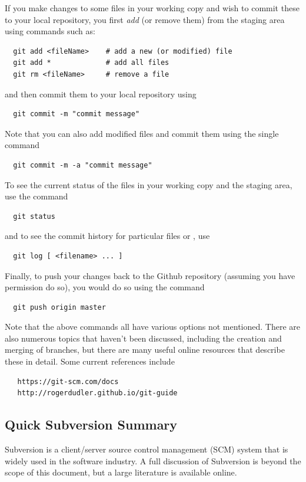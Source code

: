 If you make changes to some files in your working copy and wish to
commit these to your local repository, you first {\it add} (or remove
them) from the staging area using commands such as:
\begin{verbatim}
  git add <fileName>    # add a new (or modified) file
  git add *             # add all files
  git rm <fileName>     # remove a file
\end{verbatim}
and then commit them to your local repository using
\begin{verbatim}
  git commit -m "commit message"
\end{verbatim}
Note that you can also add modified files and commit them using the single
command
\begin{verbatim}
  git commit -m -a "commit message"
\end{verbatim}

To see the current status of the files in your working copy
and the staging area, use the command
\begin{verbatim}
  git status
\end{verbatim}
and to see the commit history for particular files or \directories{},
use 
\begin{verbatim}
  git log [ <filename> ... ]
\end{verbatim}

Finally, to push your changes back to the Github repository (assuming
you have permission do so), you would do so using the command
\begin{verbatim}
  git push origin master
\end{verbatim}

Note that the above commands all have various options not mentioned.
There are also numerous topics that haven't been discussed, including
the creation and merging of branches, but there are many useful online
resources that describe these in detail. Some current references
include
\begin{verbatim}
   https://git-scm.com/docs
   http://rogerdudler.github.io/git-guide
\end{verbatim}

\subsection{Quick Subversion Summary}
\label{SubversionSummary}

Subversion is a client/server source control management (SCM) system
that is widely used in the software industry.  A full discussion of
Subversion is beyond the scope of this document, but a large
literature is available online. 

